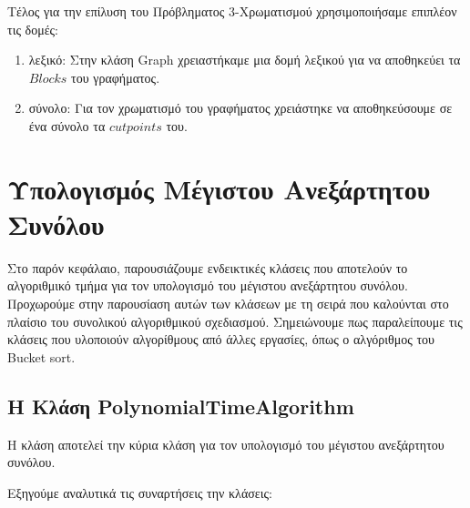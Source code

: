 Τέλος για την επίλυση του Πρόβληματος 3-Χρωματισμού χρησιμοποιήσαμε επιπλέον τις δομές:
 
\begin{enumerate}
	\item λεξικό: Στην κλάση Graph χρειαστήκαμε μια δομή λεξικού για να αποθηκεύει τα $Blocks$ του γραφήματος.
	
	\item σύνολο: Για τον χρωματισμό του γραφήματος χρειάστηκε να αποθηκεύσουμε σε ένα σύνολο τα $cutpoints$ του.
\end{enumerate}

\section{Υπολογισμός Μέγιστου Ανεξάρτητου Συνόλου}
\label{sec:Impl-Independent-set}

Στο παρόν κεφάλαιο, παρουσιάζουμε ενδεικτικές κλάσεις που αποτελούν το αλγοριθμικό τμήμα για τον υπολογισμό του μέγιστου ανεξάρτητου συνόλου. Προχωρούμε στην παρουσίαση αυτών των κλάσεων με τη σειρά που καλούνται στο πλαίσιο του συνολικού αλγοριθμικού σχεδιασμού. Σημειώνουμε πως παραλείπουμε τις κλάσεις που υλοποιούν αλγορίθμους από άλλες εργασίες, όπως ο αλγόριθμος του Bucket sort.

\captionsetup[lstlisting]{labelformat = empty}

\subsection{H Kλάση PolynomialTimeAlgorithm}
\label{subsec:PolynomialTimeAlgorithm-IndependentSet}
Η κλάση  αποτελεί την κύρια κλάση για τον υπολογισμό του μέγιστου ανεξάρτητου συνόλου.





Εξηγούμε αναλυτικά τις συναρτήσεις την κλάσεις:

